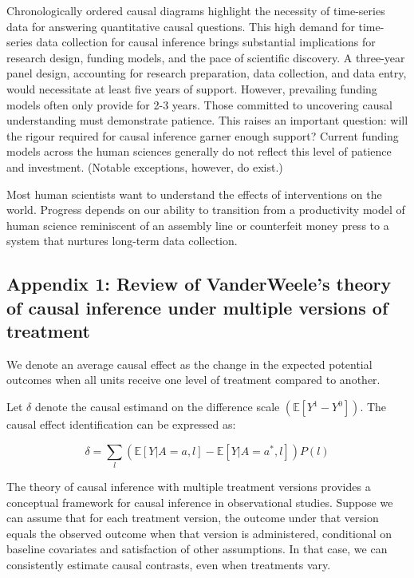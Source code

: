 \documentclass[
  singlecolumn]{article}
\begin{document}
Chronologically ordered causal diagrams highlight the necessity of
time-series data for answering quantitative causal questions. This high
demand for time-series data collection for causal inference brings
substantial implications for research design, funding models, and the
pace of scientific discovery. A three-year panel design, accounting for
research preparation, data collection, and data entry, would necessitate
at least five years of support. However, prevailing funding models often
only provide for 2-3 years. Those committed to uncovering causal
understanding must demonstrate patience. This raises an important
question: will the rigour required for causal inference garner enough
support? Current funding models across the human sciences generally do
not reflect this level of patience and investment. (Notable exceptions,
however, do exist.)

Most human scientists want to understand the effects of interventions on
the world. Progress depends on our ability to transition from a
productivity model of human science reminiscent of an assembly line or
counterfeit money press to a system that nurtures long-term data
collection.

\newpage{}

\hypertarget{appendix-1-review-of-vanderweeles-theory-of-causal-inference-under-multiple-versions-of-treatment}{%
\subsection{Appendix 1: Review of VanderWeele's theory of causal
inference under multiple versions of
treatment}\label{appendix-1-review-of-vanderweeles-theory-of-causal-inference-under-multiple-versions-of-treatment}}

We denote an average causal effect as the change in the expected
potential outcomes when all units receive one level of treatment
compared to another.

Let \(\delta\) denote the causal estimand on the difference scale
\((\mathbb{E}[Y^1 - Y^0])\). The causal effect identification can be
expressed as:

\[ \delta = \sum_l \left( \mathbb{E}[Y|A=a,l] - \mathbb{E}[Y|A=a^*,l] \right) P(l)\]

The theory of causal inference with multiple treatment versions provides
a conceptual framework for causal inference in observational studies.
Suppose we can assume that for each treatment version, the outcome under
that version equals the observed outcome when that version is
administered, conditional on baseline covariates and satisfaction of
other assumptions. In that case, we can consistently estimate causal
contrasts, even when treatments vary.
\end{document}
